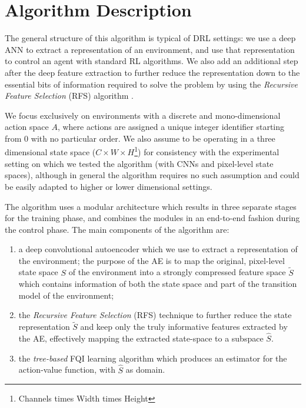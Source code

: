 \section{Algorithm Description}
The general structure of this algorithm is typical of DRL settings: we use a 
deep ANN to extract a representation of an environment, and use that 
representation to control an agent with standard RL algorithms. We also add an 
additional step after the deep feature extraction to further reduce the 
representation down to the essential bits of information required to solve the 
problem by using the \textit{Recursive Feature Selection} (RFS) algorithm 
\cite{castelletti2011tree}.

We focus exclusively on environments with a discrete and mono-dimensional 
action space $A$, where actions are assigned a unique integer identifier 
starting from $0$ with no particular order. 
We also assume to be operating in a three dimensional state space 
($C \times W \times H$\footnote{Channels times Width times Height}) for 
consistency with the experimental setting on which we tested the algorithm (with
CNNs and pixel-level state spaces), although in general the algorithm requires 
no such assumption and could be easily adapted to higher or lower dimensional 
settings. 

The algorithm uses a modular architecture which results in three separate stages
for the training phase, and combines the modules in an end-to-end fashion during
the control phase. The main components of the algorithm are:
%
\begin{enumerate}
    \item a deep convolutional autoencoder which we use to extract a 
    representation of the environment;
    the purpose of the AE is to map the original, pixel-level state space $S$ of
    the environment into a strongly compressed feature space ${\tilde{S}}$ which
    contains information of both the state space and part of the transition 
    model of the environment;
    \item the \textit{Recursive Feature Selection} (RFS) technique to further 
    reduce the state representation $\tilde{S}$ and keep only the truly 
    informative features extracted by the AE, effectively mapping the extracted 
    state-space to a subspace $\hat{S}$.
    \item the \textit{tree-based} FQI learning algorithm which produces an 
    estimator for the action-value function, with $\hat{S}$ as domain. 
\end{enumerate}
%

